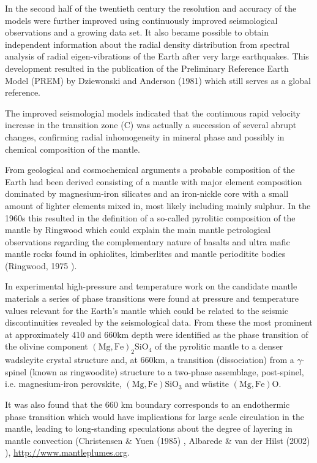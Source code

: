In the second half of the twentieth century the resolution and 
accuracy of the models were further improved using 
continuously improved seismological observations and a growing 
data set.
It also became possible to obtain independent information about
the radial density distribution from spectral analysis of 
radial eigen-vibrations of the Earth after very large earthquakes.
This development resulted in the publication of the 
Preliminary Reference Earth Model (PREM) by Dziewonski and Anderson (1981) \cite{dzan81}
which still serves as a global reference.

The improved seismologial models indicated
that the continuous rapid velocity increase in the transition zone (C) 
was actually a succession of several abrupt changes,
confirming radial inhomogeneity in mineral phase and possibly in 
chemical composition of the mantle.
 
From geological and cosmochemical arguments a probable composition of 
the Earth had been derived consisting of a mantle with major element
composition dominated by magnesium-iron silicates and an iron-nickle
core with a small amount of lighter elements mixed in,
most likely including mainly sulphur. 
In the 1960s this resulted in the definition of a so-called
pyrolitic composition of the mantle by Ringwood
which could explain the main
mantle petrological observations regarding the complementary
nature of basalts and ultra mafic mantle rocks found in ophiolites, 
kimberlites and mantle perioditite bodies
(Ringwood, 1975 \cite{ring75}). 

In experimental high-pressure and temperature work on the 
candidate mantle materials a series of phase transitions were found
at pressure and temperature values relevant for the Earth's mantle
which could be related to the seismic discontinuities 
revealed by the seismological data.
From these the most prominent at approximately 410 and 660\si{\kilo\metre} depth 
were identified as the phase transition of the olivine component 
$\mathrm{(Mg,Fe)_2 SiO_4}$
of the pyrolitic mantle
to a denser wadsleyite crystal structure and,
at 660\si{\kilo\metre}, a transition (dissociation) from a $\gamma$-spinel 
(known as ringwoodite) structure to a two-phase assemblage, 
post-spinel, i.e.
magnesium-iron perovskite, 
$\mathrm{(Mg,Fe)SiO_3}$ and w\"{u}stite $\mathrm{(Mg,Fe)O}$. 

It was also found that the 660 km boundary corresponds to an
endothermic phase transition which would have implications for 
large scale circulation in the mantle, leading to long-standing 
speculations about the degree of layering in mantle convection
(Christensen \& Yuen (1985) \cite{chyu85},
Albarede \& van der Hilst (2002) \cite{alva02}), \url{http://www.mantleplumes.org}.

